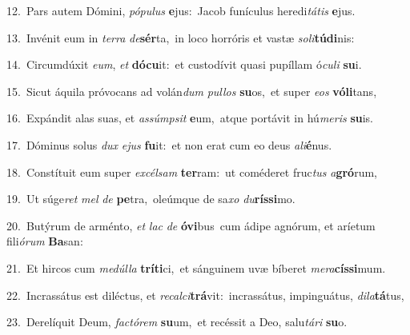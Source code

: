{\numbfont\textcolor{\numbcolor}{12.}}~Pars autem Dómini, \textit{pó}\-\textit{pu}\textit{lus} \textbf{e}\-jus:~\star Jacob funículus heredi\-\textit{tá}\-\textit{tis} \textbf{e}\-jus.\par
{\numbfont\textcolor{\numbcolor}{13.}}~Invénit eum in \textit{ter}\-\textit{ra} \textit{de}\-\textbf{sér}ta,~\star in loco horróris et vastæ \textit{so}\-\textit{li}\textbf{tú}\textbf{di}nis:\par
{\numbfont\textcolor{\numbcolor}{14.}}~Circumdúxit \textit{e}\-\textit{um}, \textit{et} \textbf{dó}\-\textbf{cu}it:~\star et custodívit quasi pupíllam ó\-\textit{cu}\-\textit{li} \textbf{su}\-i.\par
{\numbfont\textcolor{\numbcolor}{15.}}~Sicut áquila próvocans ad volán\textit{dum} \textit{pul}\-\textit{los} \textbf{su}\-os,~\star et super \textit{e}\-\textit{os} \textbf{vó}\-\textbf{li}tans,\par
{\numbfont\textcolor{\numbcolor}{16.}}~Expándit alas suas, et \textit{as}\-\textit{súmp}\textit{sit} \textbf{e}\-um,~\star atque portávit in hú\-\textit{me}\-\textit{ris} \textbf{su}\-is.\par
{\numbfont\textcolor{\numbcolor}{17.}}~Dóminus solus \textit{dux} \textit{e}\-\textit{jus} \textbf{fu}\-it:~\star et non erat cum eo deus \textit{a}\-\textit{li}\textbf{é}nus.\par
{\numbfont\textcolor{\numbcolor}{18.}}~Constítuit eum super \textit{ex}\-\textit{cél}\textit{sam} \textbf{ter}\-ram:~\star ut coméderet fruc\textit{tus} \textit{a}\-\textbf{gró}rum,\par
{\numbfont\textcolor{\numbcolor}{19.}}~Ut súge\textit{ret} \textit{mel} \textit{de} \textbf{pe}\-tra,~\star oleúmque de sa\textit{xo} \textit{du}\-\textbf{rís}\textbf{si}mo.\par
{\numbfont\textcolor{\numbcolor}{20.}}~Butýrum de arménto, \textit{et} \textit{lac} \textit{de} \textbf{ó}\-\textbf{vi}bus~\star cum ádipe agnórum, et aríetum fili\-\textit{ó}\-\textit{rum} \textbf{Ba}\-san:\par
{\numbfont\textcolor{\numbcolor}{21.}}~Et hircos cum \textit{me}\-\textit{dúl}\textit{la} \textbf{trí}\-\textbf{ti}ci,~\star et sánguinem uvæ bíberet \textit{me}\-\textit{ra}\textbf{cís}\textbf{si}mum.\par
{\numbfont\textcolor{\numbcolor}{22.}}~Incrassátus est diléctus, et \textit{re}\-\textit{cal}\textit{ci}\textbf{trá}vit:~\star incrassátus, impinguátus, \textit{di}\-\textit{la}\textbf{tá}tus,\par
{\numbfont\textcolor{\numbcolor}{23.}}~Derelíquit Deum, \textit{fac}\-\textit{tó}\textit{rem} \textbf{su}\-um,~\star et recéssit a Deo, salu\-\textit{tá}\-\textit{ri} \textbf{su}\-o.\par
